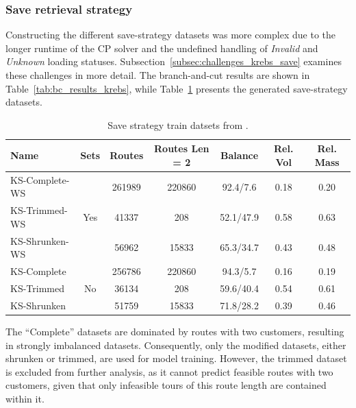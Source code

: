 \subsubsection{Save retrieval strategy}

Constructing the different save-strategy datasets was more complex due to the longer runtime of the \gls{CP} solver and the undefined
handling of \textit{Invalid} and \textit{Unknown} loading statuses. Subsection~\ref{subsec:challenges_krebs_save} examines these
challenges in more detail. The branch-and-cut results are shown in Table~\ref{tab:bc_results_krebs}, while
Table~\ref{tab:saved_instances_krebs} presents the generated save-strategy datasets.

\begin{table}[ht]
    \centering
    \begin{tabular}{l c c c c c c }
        \toprule
        Name           & Sets                 & Routes & Routes Len = 2 & Balance   & Rel. Vol & Rel. Mass \\
        \midrule
        KS-Complete-WS & \multirow{3}{*}{Yes} & 261989 & 220860         & 92.4/7.6  & 0.18     & 0.20      \\
        KS-Trimmed-WS  &                      & 41337  & 208            & 52.1/47.9 & 0.58     & 0.63      \\
        KS-Shrunken-WS &                      & 56962  & 15833          & 65.3/34.7 & 0.43     & 0.48      \\        \midrule
        KS-Complete    & \multirow{3}{*}{No}  & 256786 & 220860         & 94.3/5.7  & 0.16     & 0.19      \\
        KS-Trimmed     &                      & 36134  & 208            & 59.6/40.4 & 0.54     & 0.61      \\
        KS-Shrunken    &                      & 51759  & 15833          & 71.8/28.2 & 0.39     & 0.46      \\

        \bottomrule
    \end{tabular}
    \caption{Save strategy train datsets from \krebsADataSet.}
    \label{tab:saved_instances_krebs}
\end{table}

The “Complete” datasets are dominated by routes with two customers, resulting in strongly imbalanced datasets. Consequently,
only the modified datasets, either shrunken or trimmed, are used for model training. However, the trimmed dataset is excluded
from further analysis, as it cannot predict feasible routes with two customers, given that only infeasible tours of this route
length are contained within it.

